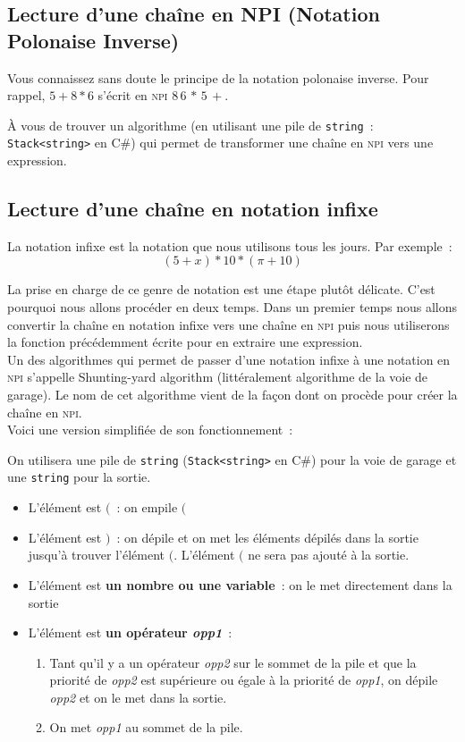 \documentclass[12pt,a4paper]{report}
\newcommand{\npi}{\textsc{npi}}
\begin{document}
\subsection{Lecture d'une chaîne en NPI (Notation Polonaise Inverse)}

Vous connaissez sans doute le principe de la notation polonaise inverse. Pour rappel, $5 + 8 * 6$ s'écrit en \npi{} $8\,6\,*\,5\,+$.

À vous de trouver un algorithme (en utilisant une pile de \texttt{string}~: \texttt{Stack<string>} en C\#) qui permet de transformer une chaîne en \npi{} vers une expression.


\subsection{Lecture d'une chaîne en notation infixe}

La notation infixe est la notation que nous utilisons tous les jours.
Par exemple~:
$$(5+x)*10*(\pi+10)$$

La prise en charge de ce genre de notation est une étape plutôt délicate. C'est pourquoi nous allons procéder en deux temps. Dans un premier temps nous allons convertir la chaîne en notation infixe vers une chaîne en \npi{} puis nous utiliserons la fonction précédemment écrite pour en extraire une expression.\\

Un des algorithmes qui permet de passer d'une notation infixe à une notation en \npi{} s'appelle Shunting-yard algorithm (littéralement algorithme de la voie de garage). Le nom de cet algorithme vient de la façon dont on procède pour créer la chaîne en \npi.\\

Voici une version simplifiée de son fonctionnement~:

On utilisera une pile de \texttt{string} (\texttt{Stack<string>} en C\#) pour la voie de garage et une \texttt{string} pour la sortie.

\begin{itemize}
	\item L'élément est $($~: on empile $($
	\item L'élément est $)$~: on dépile et on met les éléments dépilés dans la sortie jusqu'à trouver l'élément $($. L'élément $($ ne sera pas ajouté à la sortie.
	\item L'élément est \textbf{un nombre ou une variable}~: on le met directement dans la sortie
	\item L'élément est \textbf{un opérateur \textit{opp1}}~:
	\begin{enumerate}
		\item Tant qu'il y a un opérateur \textit{opp2} sur le sommet de la pile et que la priorité de \textit{opp2} est supérieure ou égale à la priorité de \textit{opp1}, on dépile \textit{opp2} et on le met dans la sortie.
		\item On met \textit{opp1} au sommet de la pile.
	\end{enumerate}
\end{itemize}
\end{document}
